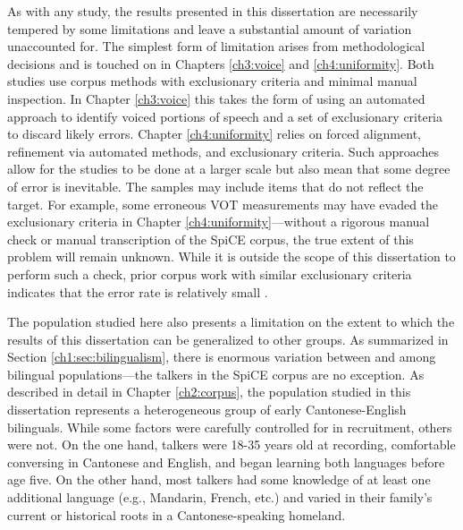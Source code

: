 As with any study, the results presented in this dissertation are necessarily tempered by some limitations and leave a substantial amount of variation unaccounted for. The simplest form of limitation arises from methodological decisions and is touched on in Chapters \ref{ch3:voice} and \ref{ch4:uniformity}. Both studies use corpus methods with exclusionary criteria and minimal manual inspection. In Chapter \ref{ch3:voice} this takes the form of using an automated approach to identify voiced portions of speech and a set of exclusionary criteria to discard likely errors. Chapter \ref{ch4:uniformity} relies on forced alignment, refinement via automated methods, and exclusionary criteria. Such approaches allow for the studies to be done at a larger scale but also mean that some degree of error is inevitable. The samples may include items that do not reflect the target. For example, some erroneous VOT measurements may have evaded the exclusionary criteria in Chapter \ref{ch4:uniformity}---without a rigorous manual check or manual transcription of the SpiCE corpus, the true extent of this problem will remain unknown. While it is outside the scope of this dissertation to perform such a check, prior corpus work with similar exclusionary criteria indicates that the error rate is relatively small \citep[5\%:][]{chodroff_2019_l2}.

The population studied here also presents a limitation on the extent to which the results of this dissertation can be generalized to other groups. As summarized in Section \ref{ch1:sec:bilingualism}, there is enormous variation between and among bilingual populations---the talkers in the SpiCE corpus are no exception. As described in detail in Chapter \ref{ch2:corpus}, the population studied in this dissertation represents a heterogeneous group of early Cantonese-English bilinguals. While some factors were carefully controlled for in recruitment, others were not. On the one hand, talkers were 18-35 years old at recording, comfortable conversing in Cantonese and English, and began learning both languages before age five. On the other hand, most talkers had some knowledge of at least one additional language (e.g., Mandarin, French, etc.) and varied in their family's current or historical roots in a Cantonese-speaking homeland.  

